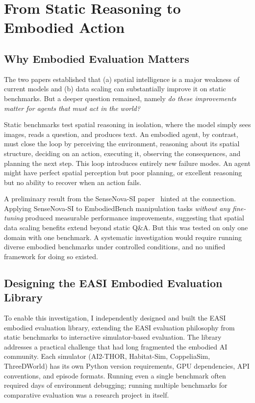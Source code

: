 \chapter{From Static Reasoning to Embodied Action}
\label{sec:embodied}

\section{Why Embodied Evaluation Matters}

The two papers established that (a) spatial intelligence is a major weakness of current models and (b) data scaling can substantially improve it on static benchmarks. But a deeper question remained, namely \textit{do these improvements matter for agents that must act in the world?}

Static benchmarks test spatial reasoning in isolation, where the model simply sees images, reads a question, and produces text. An embodied agent, by contrast, must close the loop by perceiving the environment, reasoning about its spatial structure, deciding on an action, executing it, observing the consequences, and planning the next step. This loop introduces entirely new failure modes. An agent might have perfect spatial perception but poor planning, or excellent reasoning but no ability to recover when an action fails.

A preliminary result from the SenseNova-SI paper~\cite{cai2025scalingspatialintelligencemultimodal} hinted at the connection. Applying SenseNova-SI to EmbodiedBench manipulation tasks \textit{without any fine-tuning} produced measurable performance improvements, suggesting that spatial data scaling benefits extend beyond static Q\&A. But this was tested on only one domain with one benchmark. A systematic investigation would require running diverse embodied benchmarks under controlled conditions, and no unified framework for doing so existed.

\section{Designing the EASI Embodied Evaluation Library}

To enable this investigation, I independently designed and built the EASI embodied evaluation library, extending the EASI evaluation philosophy from static benchmarks to interactive simulator-based evaluation. The library addresses a practical challenge that had long fragmented the embodied AI community. Each simulator (AI2-THOR, Habitat-Sim, CoppeliaSim, ThreeDWorld) has its own Python version requirements, GPU dependencies, API conventions, and episode formats. Running even a single benchmark often required days of environment debugging; running multiple benchmarks for comparative evaluation was a research project in itself.

